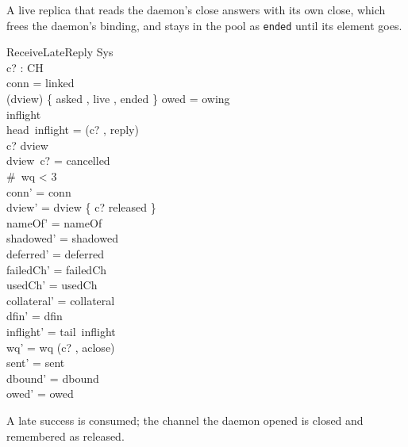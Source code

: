 \documentclass[a4paper,10pt,fleqn]{article}
\begin{document}
A live replica that reads the daemon's close answers with its own close, which frees the daemon's binding, and stays in the pool as \texttt{ended} until its element goes.

\begin{schema}{ReceiveLateReply}
  \Delta Sys \\
  c? : CH \\
\where
  conn = linked \\
  (\ran dview) \cap \{ asked , live , ended \} \neq \emptyset \lor owed = owing \\
  inflight \neq \langle \rangle \\
  head~inflight = (c? , reply) \\
  c? \in \dom dview \\
  dview~c? = cancelled \\
  \#~wq < 3 \\
  conn' = conn \\
  dview' = dview \oplus \{ c? \mapsto released \} \\
  nameOf' = nameOf \\
  shadowed' = shadowed \\
  deferred' = deferred \\
  failedCh' = failedCh \\
  usedCh' = usedCh \\
  collateral' = collateral \\
  dfin' = dfin \\
  inflight' = tail~inflight \\
  wq' = wq \cat \langle (c? , aclose) \rangle \\
  sent' = sent \\
  dbound' = dbound \\
  owed' = owed
\end{schema}

A late success is consumed; the channel the daemon opened is closed and remembered as released.
\end{document}
